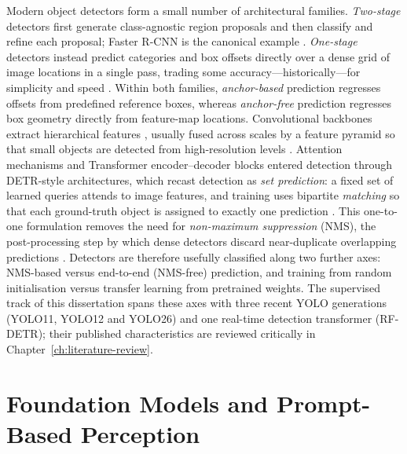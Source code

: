 Modern object detectors form a small number of architectural families. \emph{Two-stage} detectors first generate class-agnostic region proposals and then classify and refine each proposal; Faster R-CNN is the canonical example \citep{ren2015faster}. \emph{One-stage} detectors instead predict categories and box offsets directly over a dense grid of image locations in a single pass, trading some accuracy---historically---for simplicity and speed \citep{redmon2016you,liu2016ssd,lin2017focal}. Within both families, \emph{anchor-based} prediction regresses offsets from predefined reference boxes, whereas \emph{anchor-free} prediction regresses box geometry directly from feature-map locations. Convolutional backbones extract hierarchical features \citep{he2016deep}, usually fused across scales by a feature pyramid so that small objects are detected from high-resolution levels \citep{lin2017feature}. Attention mechanisms and Transformer encoder--decoder blocks \citep{dosovitskiy2021image} entered detection through DETR-style architectures, which recast detection as \emph{set prediction}: a fixed set of learned queries attends to image features, and training uses bipartite \emph{matching} so that each ground-truth object is assigned to exactly one prediction \citep{carion2020end}. This one-to-one formulation removes the need for \emph{non-maximum suppression} (NMS), the post-processing step by which dense detectors discard near-duplicate overlapping predictions \citep{neubeck2006efficient}. Detectors are therefore usefully classified along two further axes: NMS-based versus end-to-end (NMS-free) prediction, and training from random initialisation versus transfer learning from pretrained weights. The supervised track of this dissertation spans these axes with three recent YOLO generations (YOLO11, YOLO12 and YOLO26) and one real-time detection transformer (RF-DETR); their published characteristics are reviewed critically in Chapter~\ref{ch:literature-review}.

\section{Foundation Models and Prompt-Based Perception}
\label{sec:bg-foundation}

